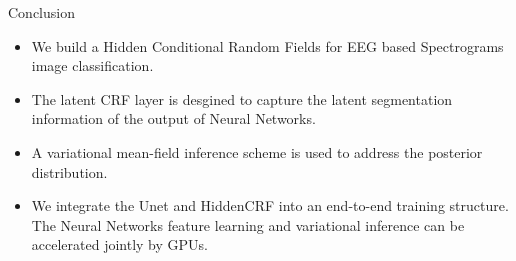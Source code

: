 \documentclass[leqno]{beamer}
\begin{document}
\begin{frame}{Conclusion}
\begin{itemize}
\item We build a Hidden Conditional Random Fields for EEG based Spectrograms
image classification.
\bigskip
\item The latent CRF layer is desgined to capture the latent segmentation
information of the output of Neural Networks.
\bigskip
\item A variational mean-field inference scheme is used to address the
posterior distribution.
\bigskip
\item We integrate the Unet and HiddenCRF into an end-to-end training structure.
The Neural Networks feature learning and variational inference can be
accelerated jointly by GPUs.
\end{itemize}
\end{frame}


%
%
\end{document}

